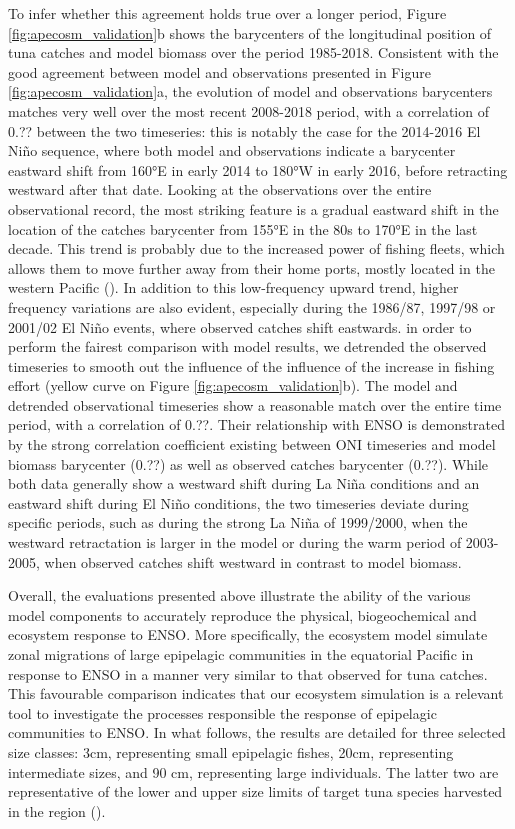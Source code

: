 To infer whether this agreement holds true over a longer period, Figure \ref{fig:apecosm_validation}b shows the barycenters of the longitudinal position of tuna catches and model biomass over the period 1985-2018. Consistent with the good agreement between model and observations presented in Figure \ref{fig:apecosm_validation}a, the evolution of model and observations barycenters matches very well over the most recent 2008-2018 period, with a correlation of 0.?? between the two timeseries: this is notably the case for the 2014-2016 El Niño sequence, where both model and observations indicate a barycenter eastward shift from 160°E in early 2014 to 180°W in early 2016, before retracting westward after that date. Looking at the observations over the entire observational record, the most striking feature is a gradual eastward shift in the location of the catches barycenter from 155°E in the 80s to 170°E in the last decade. This trend is probably due to the increased power of fishing fleets, which allows them to move further away from their home ports, mostly located in the western Pacific (). In addition to this low-frequency upward trend, higher frequency variations are also evident, especially during the 1986/87, 1997/98 or 2001/02 El Niño events, where observed catches shift eastwards. in order to perform the fairest comparison with model results, we detrended the observed timeseries to smooth out the influence of the influence of the increase in fishing effort (yellow curve on Figure \ref{fig:apecosm_validation}b). The model and detrended observational timeseries show a reasonable match over the entire time period, with a correlation of 0.??. Their relationship with ENSO is demonstrated by the strong correlation coefficient existing between ONI timeseries and model biomass barycenter (0.??) as well as observed catches barycenter (0.??). While both data generally show a westward shift during La Niña conditions and an eastward shift during El Niño conditions, the two timeseries deviate during specific periods, such as during the strong  La Niña of 1999/2000, when the westward retractation is larger in the model or during the warm period of 2003-2005, when observed catches shift westward in contrast to model biomass. 

Overall, the evaluations presented above illustrate the ability of the various model components to accurately reproduce the physical, biogeochemical and ecosystem response to ENSO. More specifically, the ecosystem model simulate zonal migrations of large epipelagic communities in the equatorial Pacific in response to ENSO in a manner very similar to that observed for tuna catches. This favourable comparison indicates that our ecosystem simulation is a relevant tool to investigate the processes responsible the response of epipelagic communities  to ENSO. In what follows, the results are detailed for three selected size classes: 3cm, representing small epipelagic fishes, 20cm, representing intermediate sizes, and 90 cm, representing large individuals. The latter two are representative of the lower and upper size limits of target tuna  species harvested in the region ().

\clearpage
